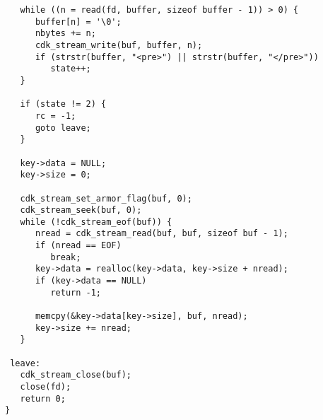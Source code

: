 \begin {verbatim}
   while ((n = read(fd, buffer, sizeof buffer - 1)) > 0) {
      buffer[n] = '\0';
      nbytes += n;
      cdk_stream_write(buf, buffer, n);
      if (strstr(buffer, "<pre>") || strstr(buffer, "</pre>"))
         state++;
   }

   if (state != 2) {
      rc = -1;
      goto leave;
   }

   key->data = NULL;
   key->size = 0;

   cdk_stream_set_armor_flag(buf, 0);
   cdk_stream_seek(buf, 0);
   while (!cdk_stream_eof(buf)) {
      nread = cdk_stream_read(buf, buf, sizeof buf - 1);
      if (nread == EOF)
         break;
      key->data = realloc(key->data, key->size + nread);
      if (key->data == NULL)
         return -1;

      memcpy(&key->data[key->size], buf, nread);
      key->size += nread;
   }

 leave:
   cdk_stream_close(buf);
   close(fd);
   return 0;
}


\end{verbatim}
